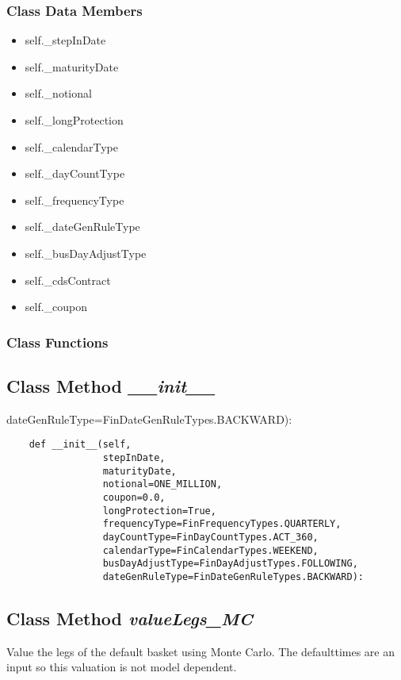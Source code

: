 \documentclass[twoside,11pt]{book}
\begin{document}
\subsubsection{Class Data Members}
\begin{itemize}
\item{self.\_stepInDate}
\item{self.\_maturityDate}
\item{self.\_notional}
\item{self.\_longProtection}
\item{self.\_calendarType}
\item{self.\_dayCountType}
\item{self.\_frequencyType}
\item{self.\_dateGenRuleType}
\item{self.\_busDayAdjustType}
\item{self.\_cdsContract}
\item{self.\_coupon}
\end{itemize}

\subsubsection{Class Functions}

\subsection{Class Method {\it \_\_init\_\_}}
dateGenRuleType=FinDateGenRuleTypes.BACKWARD):

\begin{lstlisting}
    def __init__(self,
                 stepInDate,
                 maturityDate,
                 notional=ONE_MILLION,
                 coupon=0.0,
                 longProtection=True,
                 frequencyType=FinFrequencyTypes.QUARTERLY,
                 dayCountType=FinDayCountTypes.ACT_360,
                 calendarType=FinCalendarTypes.WEEKEND,
                 busDayAdjustType=FinDayAdjustTypes.FOLLOWING,
                 dateGenRuleType=FinDateGenRuleTypes.BACKWARD):
\end{lstlisting}

\subsection{Class Method {\it valueLegs\_MC}}
Value the legs of the default basket using Monte Carlo. The defaulttimes are an input so this valuation is not model dependent. 
\end{document}
